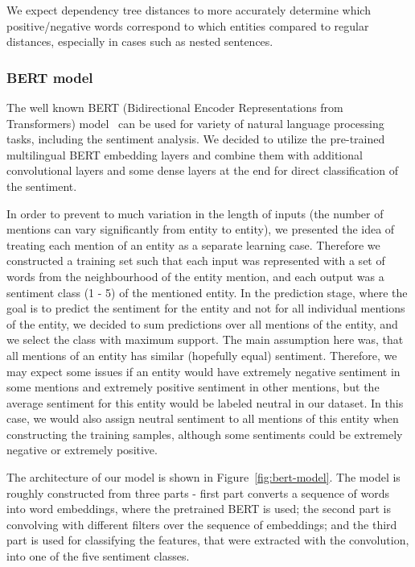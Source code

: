 \documentclass[11pt,a4paper]{article}
\begin{document}
We expect dependency tree distances to more accurately determine which positive/negative words correspond to which entities compared to regular distances, especially in cases such as nested sentences.

\subsubsection{BERT model}

The well known BERT (Bidirectional Encoder Representations from Transformers) model~\cite{devlin2018bert} can be used for variety of natural language processing tasks, including the sentiment analysis.
We decided to utilize the pre-trained multilingual BERT embedding layers and combine them with additional convolutional layers and some dense layers at the end for direct classification of the sentiment.

In order to prevent to much variation in the length of inputs (the number of mentions can vary significantly from entity to entity), we presented the idea of treating each mention of an entity as a separate learning case.
Therefore we constructed a training set such that each input was represented with a set of words from the neighbourhood of the entity mention, and each output was a sentiment class (1 - 5) of the mentioned entity.
In the prediction stage, where the goal is to predict the sentiment for the entity and not for all individual mentions of the entity, we decided to sum predictions over all mentions of the entity, and we select the class with maximum support.
The main assumption here was, that all mentions of an entity has similar (hopefully equal) sentiment.
Therefore, we may expect some issues if an entity would have extremely negative sentiment in some mentions and extremely positive sentiment in other mentions, but the average sentiment for this entity would be labeled neutral in our dataset.
In this case, we would also assign neutral sentiment to all mentions of this entity when constructing the training samples, although some sentiments could be extremely negative or extremely positive.

The architecture of our model is shown in Figure~\ref{fig:bert-model}.
The model is roughly constructed from three parts - first part converts a sequence of words into word embeddings, where the pretrained BERT is used; the second part is convolving with different filters over the sequence of embeddings; and the third part is used for classifying the features, that were extracted with the convolution, into one of the five sentiment classes.
\end{document}
